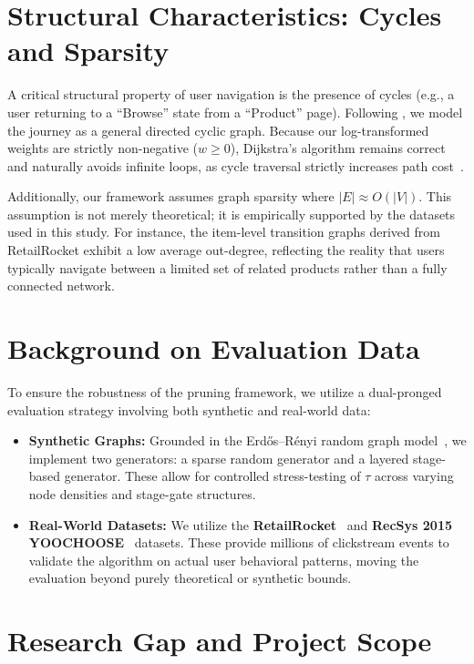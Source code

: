 \section{Structural Characteristics: Cycles and Sparsity}

A critical structural property of user navigation is the presence of cycles (e.g., a user returning to a ``Browse'' state from a ``Product'' page). Following \citet{bucklin2003clickstream}, we model the journey as a general directed cyclic graph. Because our log-transformed weights are strictly non-negative ($w \geq 0$), Dijkstra's algorithm remains correct and naturally avoids infinite loops, as cycle traversal strictly increases path cost~\citep{cormen2009}.

Additionally, our framework assumes graph sparsity where $|E| \approx O(|V|)$. This assumption is not merely theoretical; it is empirically supported by the datasets used in this study. For instance, the item-level transition graphs derived from RetailRocket exhibit a low average out-degree, reflecting the reality that users typically navigate between a limited set of related products rather than a fully connected network.

\section{Background on Evaluation Data}

To ensure the robustness of the pruning framework, we utilize a dual-pronged evaluation strategy involving both synthetic and real-world data:

\begin{itemize}
    \item \textbf{Synthetic Graphs:} Grounded in the Erd\H{o}s--R\'{e}nyi random graph model~\citep{erdosrenyi1960}, we implement two generators: a sparse random generator and a layered stage-based generator. These allow for controlled stress-testing of $\tau$ across varying node densities and stage-gate structures.
    \item \textbf{Real-World Datasets:} We utilize the \textbf{RetailRocket}~\citep{retailrocket2015} and \textbf{RecSys 2015 YOOCHOOSE}~\citep{recsys2015} datasets. These provide millions of clickstream events to validate the algorithm on actual user behavioral patterns, moving the evaluation beyond purely theoretical or synthetic bounds.
\end{itemize}

\section{Research Gap and Project Scope}

